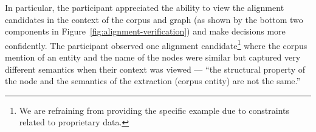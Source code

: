  In particular, the participant appreciated the ability to view the alignment candidates in the context of the corpus and graph (as shown by the bottom two components in Figure~\ref{fig:alignment-verification}) and make decisions more confidently. The participant observed one alignment candidate\footnote{We are refraining from providing the specific example due to constraints related to proprietary data.} where the corpus mention of an entity and the name of the nodes were similar but captured very different semantics when their context was viewed --- ``the structural property of the node and the semantics of the extraction (corpus entity) are not the same.''







